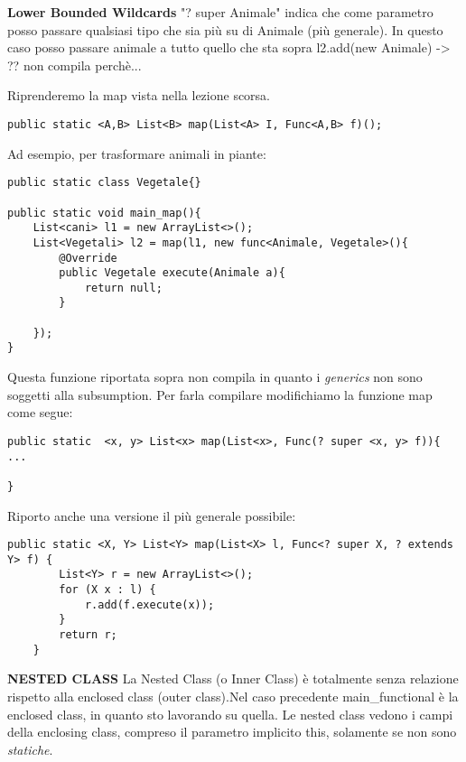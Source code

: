 \noindent \textbf{Lower Bounded Wildcards} \newline
"? super Animale" indica che come parametro posso passare qualsiasi tipo che sia più su di Animale (più generale).\newline
In questo caso posso passare animale a tutto quello che sta sopra
l2.add(new Animale) -> ?? non compila perchè... \newline

\noindent Riprenderemo la map vista nella lezione scorsa.
\begin{lstlisting}[basicstyle=\small,]
public static <A,B> List<B> map(List<A> I, Func<A,B> f)();
\end{lstlisting}
Ad esempio, per trasformare animali in piante: 

\begin{lstlisting}[basicstyle=\small,]
public static class Vegetale{}

public static void main_map(){
	List<cani> l1 = new ArrayList<>();
	List<Vegetali> l2 = map(l1, new func<Animale, Vegetale>(){
		@Override
		public Vegetale execute(Animale a){
			return null;
		}
	
	});
}
\end{lstlisting}

\noindent Questa funzione riportata sopra non compila in quanto i \textit{generics} non sono soggetti alla subsumption. Per farla compilare modifichiamo la funzione map come segue: 

\begin{lstlisting}[basicstyle=\small,]
public static  <x, y> List<x> map(List<x>, Func(? super <x, y> f)){
...

}
\end{lstlisting}

\noindent Riporto anche una versione il più generale possibile: \newline

\begin{lstlisting}[basicstyle=\small,]
    public static <X, Y> List<Y> map(List<X> l, Func<? super X, ? extends Y> f) {
        List<Y> r = new ArrayList<>();
        for (X x : l) {
            r.add(f.execute(x));
        }
        return r;
    } 
\end{lstlisting}

\noindent \textbf{NESTED CLASS}\newline
La Nested Class (o Inner Class) è totalmente senza relazione rispetto alla enclosed class (outer class).Nel caso precedente main{\_}functional è la enclosed class, in quanto sto lavorando su quella. \newline
Le nested class vedono i campi della enclosing class, compreso il parametro implicito this, solamente se non sono \textit{statiche}.


